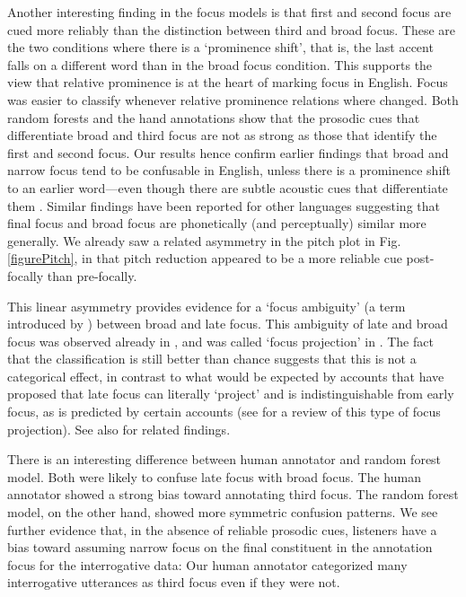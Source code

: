 \documentclass[preprint,review,12pt,authoryear,times]{elsarticle}
\begin{document}
Another interesting finding in the focus models is that first and second focus are cued more reliably than the distinction between third and broad focus. These are the two conditions where there is a `prominence shift', that is, the last accent falls on a different word than in the broad focus condition. This supports the view that relative prominence is at the heart of marking focus in English. Focus was easier to classify whenever relative prominence relations where changed. Both random forests and the hand annotations show that the prosodic cues that differentiate broad and third focus are not as strong as those that identify the first and second focus. Our results hence confirm earlier findings that broad and narrow focus tend to be confusable in English, unless there is a prominence shift to an earlier word---even though there are subtle acoustic cues that differentiate them \citep{gusse83}. Similar findings have been reported for other languages \citep{botin99,xu12} suggesting that final focus and broad focus are phonetically (and perceptually) similar more generally.  We already saw a related asymmetry in the pitch plot in Fig. \ref{figurePitch}, in that pitch reduction appeared to be a more reliable cue post-focally than pre-focally. 

This linear asymmetry provides evidence for a `focus ambiguity' (a term introduced by \citealt{jacob91c}) between broad and late focus. This ambiguity of late and broad focus was observed already in \citet{choms71}, and was called `focus projection' in \citet{hohle82}. The fact that the classification is still better than chance suggests that this is not a categorical effect, in contrast to what would be expected by accounts that have proposed that late focus can literally `project' and is indistinguishable from early focus, as is predicted by certain accounts \citep[e.g.][]{selki95} (see  \citealt[see][]{arreg16} for a review of this type of focus projection). See also \citet[][]{breenetal10} for related findings. 

There is an interesting difference between human annotator and random forest model. Both were likely to confuse late focus with broad focus. The human annotator showed a strong bias toward annotating third focus. The random forest model, on the other hand, showed more symmetric confusion patterns. We see further evidence that, in the absence of reliable prosodic cues, listeners have a bias toward assuming narrow focus on the final constituent in the annotation focus for the interrogative data: Our human annotator categorized many interrogative utterances as third focus even if they were not. 
\end{document}
